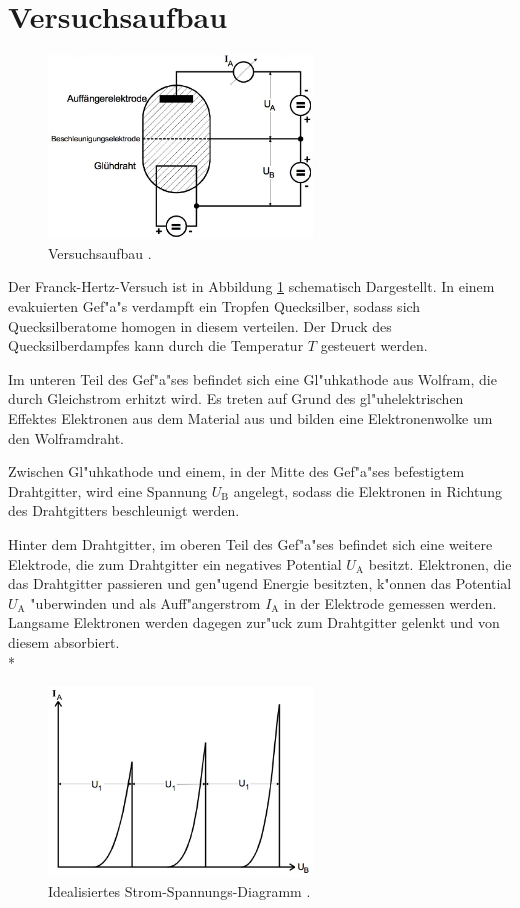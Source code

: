 \section{Versuchsaufbau}
\label{sec:aufbau}

	\begin{figure}
		\centering
		\includegraphics[width = 7cm]{img/aufbau.jpeg}
		\caption{Versuchsaufbau \cite{anleitung}. \label{fig:aufbau}}
	\end{figure}
	Der Franck-Hertz-Versuch ist in Abbildung \ref{fig:aufbau} schematisch Dargestellt.
	In einem evakuierten Gef"a"s verdampft ein Tropfen Quecksilber, sodass sich Quecksilberatome homogen in diesem verteilen.
	Der Druck des Quecksilberdampfes kann durch die Temperatur $T$ gesteuert werden.

	Im unteren Teil des Gef"a"ses befindet sich eine Gl"uhkathode aus Wolfram, die durch Gleichstrom erhitzt wird.
	Es treten auf Grund des gl"uhelektrischen Effektes Elektronen aus dem Material aus und bilden eine Elektronenwolke um den Wolframdraht.

	Zwischen Gl"uhkathode und einem, in der Mitte des Gef"a"ses befestigtem Drahtgitter, wird eine Spannung $U_\mathrm{B}$ angelegt, sodass die Elektronen in Richtung des Drahtgitters beschleunigt werden.

	Hinter dem Drahtgitter, im oberen Teil des Gef"a"ses befindet sich eine weitere Elektrode, die zum Drahtgitter ein negatives Potential $U_\mathrm{A}$ besitzt.
	Elektronen, die das Drahtgitter passieren und gen"ugend Energie besitzten, k"onnen das Potential $U_\mathrm{A}$ "uberwinden und als Auff"angerstrom $I_\mathrm{A}$ in der Elektrode gemessen werden.
	Langsame Elektronen werden dagegen zur"uck zum Drahtgitter gelenkt und von diesem absorbiert. 
	\\*

	\begin{figure}
		\centering
		\includegraphics[width = 7cm]{img/strom-spannung.jpeg}
		\caption{Idealisiertes Strom-Spannungs-Diagramm \cite{anleitung}. \label{fig:strom-spannung}}
	\end{figure}


